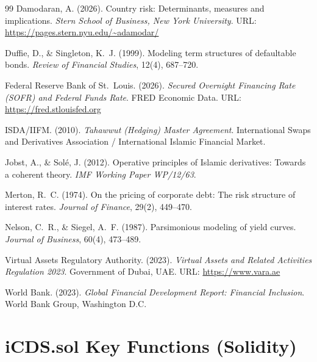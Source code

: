 \documentclass[12pt]{article}
\theoremstyle{plain}
\theoremstyle{definition}
\theoremstyle{remark}
\begin{document}
\begin{thebibliography}{99}
Damodaran, A. (2026).
\newblock Country risk: Determinants, measures and implications.
\newblock \emph{Stern School of Business, New York University}.
\newblock URL: \url{https://pages.stern.nyu.edu/~adamodar/}

Duffie, D., \& Singleton, K.~J. (1999).
\newblock Modeling term structures of defaultable bonds.
\newblock \emph{Review of Financial Studies}, 12(4), 687--720.

Federal Reserve Bank of St.\ Louis. (2026).
\newblock \emph{Secured Overnight Financing Rate (SOFR) and Federal Funds
  Rate}.
\newblock FRED Economic Data. URL: \url{https://fred.stlouisfed.org}

ISDA/IIFM. (2010).
\newblock \emph{Tahawwut (Hedging) Master Agreement}.
\newblock International Swaps and Derivatives Association / International
  Islamic Financial Market.

Jobst, A., \& Sol\'{e}, J. (2012).
\newblock Operative principles of Islamic derivatives: Towards a coherent
  theory.
\newblock \emph{IMF Working Paper WP/12/63}.

Merton, R.~C. (1974).
\newblock On the pricing of corporate debt: The risk structure of interest
  rates.
\newblock \emph{Journal of Finance}, 29(2), 449--470.

Nelson, C.~R., \& Siegel, A.~F. (1987).
\newblock Parsimonious modeling of yield curves.
\newblock \emph{Journal of Business}, 60(4), 473--489.

Virtual Assets Regulatory Authority. (2023).
\newblock \emph{Virtual Assets and Related Activities Regulation 2023}.
\newblock Government of Dubai, UAE.
\newblock URL: \url{https://www.vara.ae}

World Bank. (2023).
\newblock \emph{Global Financial Development Report: Financial Inclusion}.
\newblock World Bank Group, Washington D.C.

\end{thebibliography}


\appendix

\section{iCDS.sol Key Functions (Solidity)}
\label{app:solidity}
\end{document}
